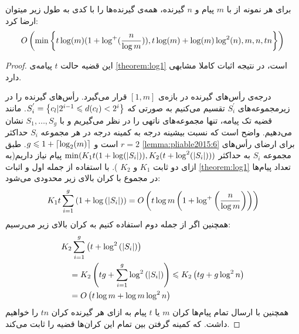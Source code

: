 \begin{theorem}
    \cite{pliable2015paper}
    \label{thm:pliable2015_7}
    برای هر نمونه از
    با
    $m$
    پیام و
    $n$
    گیرنده، همه‌ی گیرنده‌ها را با کدی به طول زیر میتوان ارضا کرد:
    \begin{equation}
        O\left( \min\left\{  t \log(m) (1 + \log^{+}(\dfrac{n}{\log m})), t \log(m) + \log(m) \log^2(n), m, n, tn \right\}\right)
    \end{equation}
\end{theorem}
\begin{proof}
    این قضیه حالت
    $t$
    پیامه‌ی
    \autoref{theorem:log1}
    است، در نتیجه اثبات کاملا مشابهی دارد.

    درجه‌ی رأس‌های گیرنده در بازه‌ی
    $[1, m]$
    قرار می‌گیرد. رأس‌های گیرنده را در زیرمجموعه‌های
    $S_i^{'}$
    تقسیم می‌کنیم به صورتی که
    $S_i^{'} = \left\{ c_l | 2^{i - 1} \leqslant d(c_l) < 2^i  \right\}$. مانند قضیه تک پیامه، تنها مجموعه‌های ناتهی را در نظر می‌گیریم و با
    $S_1, \ldots, S_g$
    نشان می‌دهیم. واضح است که نسبت بیشینه درجه به کمینه درجه در هر مجموعه
    $S_i$
    حداکثر
    $r = 2$
    است و
    $g \leqslant 1 + \left\lceil{\log_2(m)}\right\rceil$. طبق
    \autoref{lemma:pliable2015:6}
    برای ارضای رأس‌های مجموعه‌
    $S_i$
    به حداکثر
    $\min (K_1 t (1 + \log(\left|{S_i}\right|)), K_2(t + \log^2(\left|{S_i}\right|)))$
    پیام نیاز داریم(به ازای دو ثابت
    $K_1$
    و
    $K_2$
    ). با استفاده از جمله اول و اثبات
    \autoref{theorem:log1}
    تعداد پیام‌ها در مجموع با کران بالای زیر محدودی می‌شود:
    $$
    K_1 t \sum_{i=1}^g\left(1+\log \left(\left|{S_i}\right|\right)\right)=O\left(t \log m\left(1+\log ^{+}\left(\frac{n}{\log m}\right)\right)\right)
    $$
    همچنین اگر از جمله دوم استفاده کنیم به کران بالای زیر می‌رسیم:
    $$
    \begin{aligned}
        & K_2 \sum_{i=1}^g\left(t+\log ^2\left(\left|{S_i}\right|\right)\right) \\
        & \quad=K_2\left(t g+\sum_{i=1}^g \log ^2\left(\left|{S_i}\right|\right)\right) \leqslant K_2\left(t g+g \log ^2 n\right) \\
        & \quad=O\left(t \log m+\log m \log ^2 n\right)
    \end{aligned}
    $$
    همچنین با ارسال تمام پیام‌ها کران $m$ یا $t$ پیام به ازای هر گیرنده کران $tn$ را خواهیم داشت. که کمینه گرفتن بین تمام این کران‌ها قضیه را ثابت می‌کند.
\end{proof}

